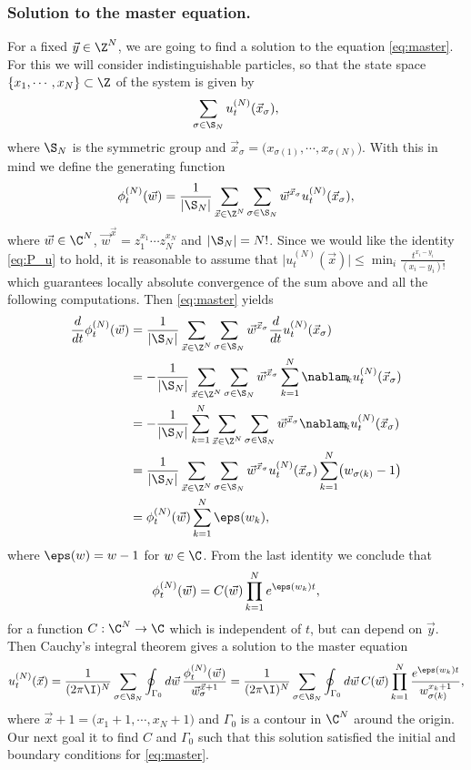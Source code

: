 \documentclass[]{pcmi}
\theoremstyle{plain}
\theoremstyle{definition}
\begin{document}
\subsubsection*{Solution to the master equation.}

For a fixed $\vec y \in \Z^N$, we are going to find a solution to the equation \eqref{eq:master}. For this we will consider indistinguishable particles, so that the state space $\{x_1, \cdots, x_N\} \subset \Z$ of the system is given by
\[
	\sum_{\sigma \in \S_N} u^{(N)}_t(\vec x_\sigma),
\]
where $\S_N$ is the symmetric group and $\vec x_\sigma = \bigl(x_{\sigma(1)}, \cdots, x_{\sigma(N)}\bigr)$. With this in mind we define the generating function 
\[
 \phi^{(N)}_t(\vec w) = \frac{1}{|\S_N|}\sum_{\vec x \in \Z^N} \sum_{\sigma \in \S_N} \vec w^{\vec x_\sigma} u^{(N)}_t(\vec x_\sigma),
\]
where $\vec w \in \C^{N}$, $\vec w^{\vec x} = z_1^{x_1} \cdots z_N^{x_N}$ and $|\S_N| = N!$. Since we would like the identity \eqref{eq:P_u} to hold, it is reasonable to assume that $\bigl|u^{(N)}_t(\vec x)\bigr| \leq \min_{i} \frac{t^{x_i - y_i}}{(x_i - y_i)!}$ which guarantees locally absolute convergence of the sum above and all the following computations. Then \eqref{eq:master} yields
\begin{align*}
 	\frac{d}{dt} \phi^{(N)}_t(\vec w) &= \frac{1}{|\S_N|} \sum_{\vec x \in \Z^N} \sum_{\sigma \in \S_N} \vec w^{\vec x_\sigma} \frac{d}{dt} u^{(N)}_t(\vec x_\sigma) \\
	&=- \frac{1}{|\S_N|} \sum_{\vec x \in \Z^N} \sum_{\sigma \in \S_N} \vec w^{\vec x_\sigma} \sum_{k=1}^N \nablam_{\!k} u^{(N)}_t(\vec x_\sigma) \\
	&= -\frac{1}{|\S_N|} \sum_{k=1}^N \sum_{\vec x \in \Z^N} \sum_{\sigma \in \S_N} \vec w^{\vec x_\sigma} \nablam_{\!k} u^{(N)}_t(\vec x_\sigma) \\
	&= \frac{1}{|\S_N|} \sum_{\vec x \in \Z^N} \sum_{\sigma \in \S_N} \vec w^{\vec x_\sigma} u^{(N)}_t(\vec x_\sigma) \sum_{k=1}^N \bigl(w_{\sigma(k)} - 1\bigr) \\
	&= \phi^{(N)}_t(\vec w) \sum_{k=1}^N \eps(w_k),
\end{align*}
where $\eps(w) = w-1$ for $w \in \C$. From the last identity we conclude that
\[
 	\phi^{(N)}_t(\vec w) = C(\vec w) \prod_{k=1}^N e^{\eps(w_k) t},
\]
for a function $C : \C^N \to \C$ which is independent of $t$, but can depend on $\vec y$. Then  Cauchy's integral theorem gives a solution to the master equation
\begin{align}\label{eq:gen_sol}
 	u^{(N)}_t(\vec x) = \frac{1}{(2\pi \I)^N} \sum_{\sigma \in \S_N} \oint_{\Gamma_0} d \vec w\, \frac{\phi^{(N)}_t(\vec w)}{\vec w_\sigma^{\vec x+1}} = \frac{1}{(2\pi \I)^N} \sum_{\sigma \in \S_N} \oint_{\Gamma_0} d\vec w\, C(\vec w) \prod_{k=1}^N \frac{e^{\eps(w_k) t}}{w_{\sigma(k)}^{x_k +1}},
\end{align}
where $\vec x + 1 = \bigl(x_1 + 1, \cdots, x_N+1\bigr)$ and $\Gamma_0$ is a contour in $\C^N$ around the origin. Our next goal it to find $C$ and $\Gamma_0$ such that this solution satisfied the initial and boundary conditions for \eqref{eq:master}. 
\end{document}
